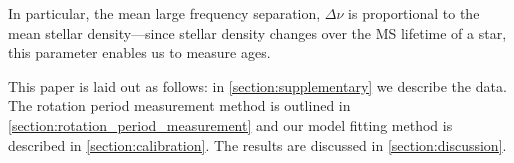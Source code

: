 \documentclass[10pt,preprint]{aastex}
\begin{document}
In particular, the mean large frequency separation, $\Delta\nu$ is proportional to the mean stellar density---since stellar density changes over the MS lifetime of a star, this parameter enables us to measure ages.

%
%

This paper is laid out as follows: in \textsection\ref{section:supplementary} we describe the data.
The rotation period measurement method is outlined in \textsection\ref{section:rotation_period_measurement} and our model fitting method is described in \textsection\ref{section:calibration}.
The results are discussed in \textsection\ref{section:discussion}.



\end{document}

